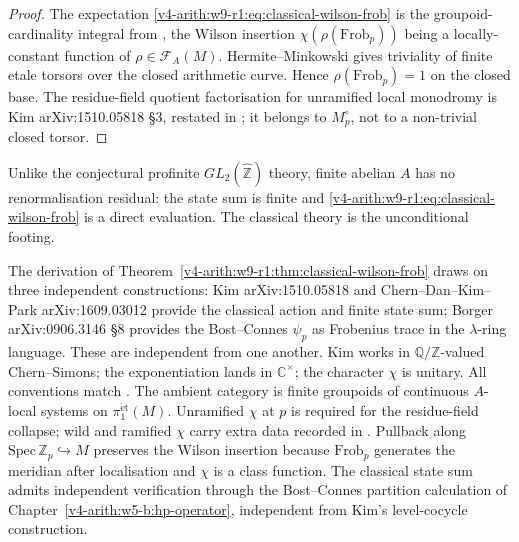 \begin{proof}
The expectation \eqref{v4-arith:w9-r1:eq:classical-wilson-frob} is the
groupoid-cardinality integral from
, the Wilson insertion
\(\chi(\rho(\mathrm{Frob}_{p}))\) being a locally-constant function of
\(\rho\in\mathcal F_{A}(M)\). Hermite--Minkowski gives triviality of
finite etale torsors over the closed arithmetic curve. Hence
\(\rho(\mathrm{Frob}_{p})=1\) on the closed base. The residue-field
quotient factorisation for unramified local monodromy is Kim
arXiv:1510.05818 \S3, restated in
; it belongs to
\(M_{p}^{\circ}\), not to a non-trivial closed torsor.
\end{proof}

\begin{remark}
\label{v4-arith:w9-r1:rem:abelian-unconditional}
Unlike the conjectural profinite
\(GL_{2}(\widehat{\mathbb Z})\) theory, finite abelian \(A\) has no
renormalisation residual: the state sum
 is finite and
\eqref{v4-arith:w9-r1:eq:classical-wilson-frob} is a direct
evaluation. The classical theory is the unconditional footing.
\end{remark}

\begin{remark}
\label{v4-arith:w9-r1:rem:classical-sources}
The derivation of Theorem~\ref{v4-arith:w9-r1:thm:classical-wilson-frob}
draws on three independent constructions: Kim arXiv:1510.05818 and
Chern--Dan--Kim--Park arXiv:1609.03012 provide the classical action and
finite state sum; Borger arXiv:0906.3146 \S8 provides the
Bost--Connes \(\psi_{p}\) as Frobenius trace in the \(\lambda\)-ring language.
These are independent from one another.
Kim works in \(\mathbb Q/\mathbb Z\)-valued Chern--Simons; the
exponentiation lands in \(\mathbb C^{\times}\); the character \(\chi\)
is unitary. All conventions match .
The ambient category is finite groupoids of continuous \(A\)-local systems
on \(\pi_{1}^{\mathrm{\acute et}}(M)\).
Unramified \(\chi\) at \(p\) is required for the residue-field collapse;
wild and ramified \(\chi\) carry extra data recorded in
.
Pullback along \(\mathrm{Spec}\,\mathbb Z_{p}\hookrightarrow M\) preserves
the Wilson insertion because \(\mathrm{Frob}_{p}\) generates the meridian
after localisation and \(\chi\) is a class function.
The classical state sum admits independent verification through the
Bost--Connes partition calculation of
Chapter~\ref{v4-arith:w5-b:hp-operator}, independent from Kim's
level-cocycle construction.
\end{remark}

